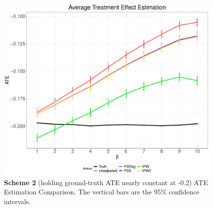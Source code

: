 \documentclass{article}
\begin{document}
		
	\begin{figure}[H]
		\centering
		\includegraphics[scale=0.5]{../results/ate_results2.pdf}
		\caption{\textbf{Scheme 2} (holding ground-truth ATE nearly constant at -0.2) ATE Estimation Comparison. The vertical bars are the 95\% confidence intervals. }
		\label{fig:results2}
	\end{figure}
	
\end{document}
